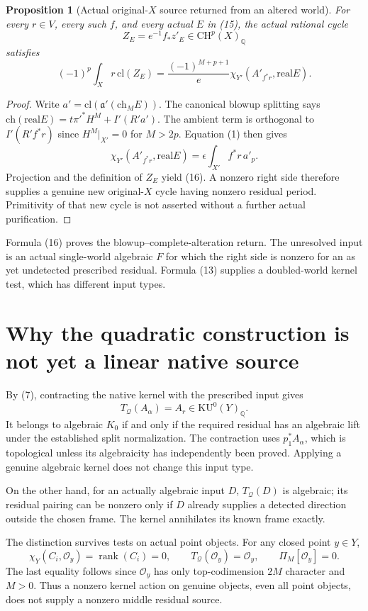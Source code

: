 \documentclass[11pt]{article}
\newcommand{\Q}{\mathbb Q}
\newcommand{\CH}{\mathrm{CH}}
\newcommand{\KU}{\mathrm{KU}}
\newcommand{\cl}{\mathrm{cl}}
\newcommand{\ch}{\mathrm{ch}}
\newcommand{\real}{\mathrm{real}}
\newtheorem{proposition}[theorem]{Proposition}
\begin{document}
\begin{proposition}[Actual original-$X$ source returned from an altered world]
For every $r\in V$, every such $f$, and every actual $E$ in (15),
the actual rational cycle
\[
 \boxed{Z_E=e^{-1}f_*z'_E\in\CH^p(X)_\Q}
\]
satisfies
\[
 \boxed{
 (-1)^p\int_Xr\,\cl(Z_E)
   =\frac{(-1)^{M+p+1}}e
       \chi_{Y'}(A'_{f^*r},\real E).}               \tag{16}
\]
\end{proposition}
\begin{proof}
Write $a'=\cl(\mathfrak a'(\ch_M E))$.
The canonical blowup splitting says
$\ch(\real E)=t\pi'^*H^M+I'(R'a')$.
The ambient term is orthogonal to $I'(R'f^*r)$ since
$H^M|_{X'}=0$ for $M>2p$.
Equation (1) then gives
\[
 \chi_{Y'}(A'_{f^*r},\real E)
      =\epsilon\int_{X'}f^*r\,a'_p .
\]
Projection and the definition of $Z_E$ yield (16).
A nonzero right side therefore supplies a genuine new original-$X$
cycle having nonzero residual period. Primitivity of that new
cycle is not asserted without a further actual purification.
\end{proof}

Formula (16) proves the blowup--complete-alteration return.
The unresolved input is an actual single-world algebraic $F$
for which the right side is nonzero for an as yet undetected
prescribed residual. Formula (13) supplies a doubled-world
kernel test, which has different input types.

\section{Why the quadratic construction is not yet a linear native source}
By (7), contracting the native kernel with the prescribed input gives
\[
 T_{\mathscr Q}(A_\alpha)=A_r\in\KU^0(Y)_\Q .
\]
It belongs to algebraic $K_0$ if and only if the required residual
has an algebraic lift under the established split normalization.
The contraction uses $p_1^*A_\alpha$, which is topological unless
its algebraicity has independently been proved.
Applying a genuine algebraic kernel does not change this input type.

On the other hand, for an actually algebraic input $D$,
$T_{\mathscr Q}(D)$ is algebraic; its residual pairing can be
nonzero only if $D$ already supplies a detected direction outside
the chosen frame. The kernel annihilates its known frame exactly.

The distinction survives tests on actual point objects.
For any closed point $y\in Y$,
\[
 \chi_Y(C_i,\mathcal O_y)=\operatorname{rank}(C_i)=0,\qquad
 T_{\mathscr Q}(\mathcal O_y)=\mathcal O_y,\qquad
 \Pi_M[\mathcal O_y]=0.
\]
The last equality follows since $\mathcal O_y$ has only
top-codimension $2M$ character and $M>0$.
Thus a nonzero kernel action on genuine objects, even all point
objects, does not supply a nonzero middle residual source.
\end{document}
